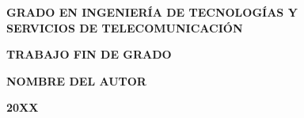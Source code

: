 \pagestyle{empty}

\vspace*{5.5cm}

\begin{center}

{\Large\rm \textbf{ GRADO EN INGENIERÍA DE TECNOLOGÍAS Y\\
SERVICIOS DE TELECOMUNICACIÓN\\}}

\vspace{1.0cm}

{\Large\rm \textbf{TRABAJO FIN DE GRADO}}

\vspace{2cm}

{\Large\rm\textbf{\tfgtitle}}

\vspace*{\fill}

{\Large\rm\textbf{NOMBRE DEL AUTOR}}

{\Large \textbf{20XX}}
\vspace{1.0cm}
\end{center}

